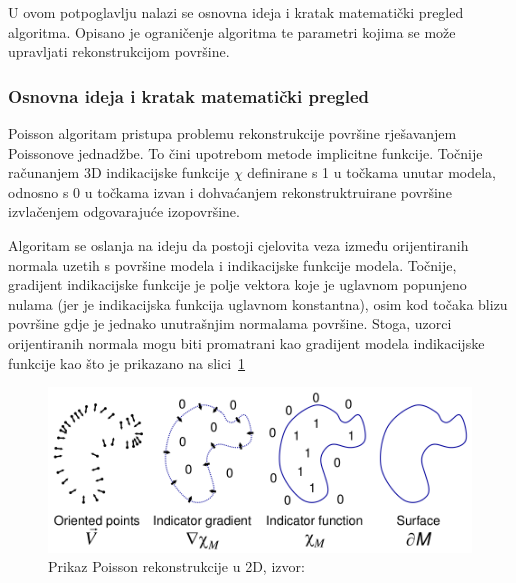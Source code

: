 U ovom potpoglavlju nalazi se osnovna ideja i kratak matematički pregled
algoritma. Opisano je ograničenje algoritma te parametri kojima se može
upravljati rekonstrukcijom površine.



\subsubsection{Osnovna ideja i kratak matematički pregled} %
\label{ssub:Osnovna ideja i kratak matematički pregled}

Poisson algoritam pristupa problemu rekonstrukcije površine rješavanjem
Poissonove jednadžbe. To čini upotrebom metode implicitne funkcije.
Točnije računanjem 3D indikacijske funkcije \(\chi\) definirane s 1 u
točkama unutar modela, odnosno s 0 u točkama izvan i dohvaćanjem
rekonstruktruirane površine izvlačenjem odgovarajuće izopovršine.

Algoritam se oslanja na ideju da postoji cjelovita veza između
orijentiranih normala uzetih s površine modela i indikacijske funkcije
modela. Točnije, gradijent indikacijske funkcije je polje vektora koje
je uglavnom popunjeno nulama (jer je indikacijska funkcija uglavnom
konstantna), osim kod točaka blizu površine gdje je jednako unutrašnjim
normalama površine. Stoga, uzorci orijentiranih normala mogu biti
promatrani kao gradijent modela indikacijske funkcije kao što je
prikazano na slici~\ref{fig:poisson-reconstruction.png}

\begin{figure}[h]
\centering
\includegraphics[scale=0.35]{figures/poisson-reconstruction.png}
\caption[]{Prikaz Poisson rekonstrukcije u 2D,
    izvor:~\cite{Kazhdan:2006}}
\label{fig:poisson-reconstruction.png}
\end{figure}

